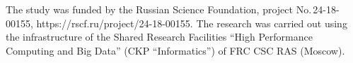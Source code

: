 



\vspace*{-12pt}


     \Ack
     
     \vspace*{-3pt}
     
      \noindent
            The study was funded by the Russian Science Foundation, project No.\,24-18-00155, {\sf 
https://rscf.ru/project/24-18-00155}. The research was carried out using the infrastructure of the Shared 
Research Facilities ``High Performance Computing and Big Data'' (CKP ``Informatics'') of FRC CSC RAS 
(Moscow).
     


